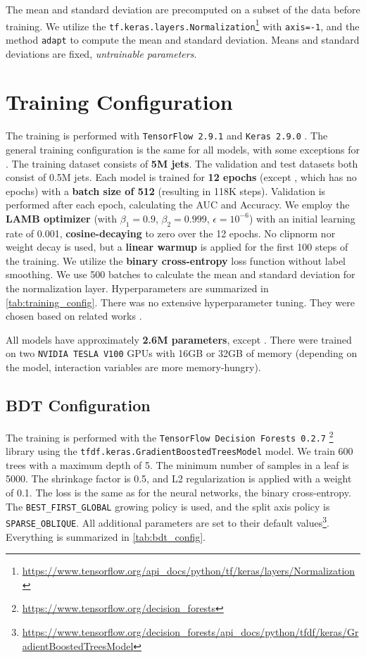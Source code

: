 The mean and standard deviation are precomputed on a subset of the data before training.
We utilize the \texttt{tf.keras.layers.Normalization}\footnote{\url{https://www.tensorflow.org/api_docs/python/tf/keras/layers/Normalization}} with \texttt{axis=-1}, and the method \texttt{adapt} to compute the mean and standard deviation.
Means and standard deviations are fixed, \emph{untrainable parameters}.


\section{Training Configuration}
\label{sec:training_config}

The training is performed with \texttt{TensorFlow 2.9.1} \cite{tf} and \texttt{Keras 2.9.0} \cite{keras}.
The general training configuration is the same for all models, with some exceptions for \bdt.
The training dataset consists of \textbf{5M jets}.
The validation and test datasets both consist of 0.5M jets.
Each model is trained for \textbf{12 epochs} (except \bdt, which has no epochs) with a \textbf{batch size of 512} (resulting in 118K steps).
Validation is performed after each epoch, calculating the AUC and Accuracy.
We employ the \textbf{LAMB optimizer} (with $\beta_1= 0.9$, $\beta_2= 0.999$, $\epsilon= 10^{-6}$) with an initial learning rate of 0.001, \textbf{cosine-decaying} to zero over the 12 epochs.
No clipnorm nor weight decay is used, but a \textbf{linear warmup} is applied for the first 100 steps of the training.
We utilize the \textbf{binary cross-entropy} loss function without label smoothing.
We use 500 batches to calculate the mean and standard deviation for the normalization layer.
Hyperparameters are summarized in \cref{tab:training_config}.
There was no extensive hyperparameter tuning. 
They were chosen based on related works \cite{deit3,part,cait,bert}.

All models have approximately \textbf{2.6M parameters}, except \bdt.
There were trained on two \texttt{NVIDIA TESLA V100} GPUs with 16GB or 32GB of memory (depending on the model, interaction variables are more memory-hungry).

\subsection{BDT Configuration}
\label{sec:bdt_config}

The training is performed with the \texttt{TensorFlow Decision Forests 0.2.7} \footnote{\url{https://www.tensorflow.org/decision_forests}} library using the \texttt{tfdf.keras.GradientBoostedTreesModel} model.
We train 600 trees with a maximum depth of 5.
The minimum number of samples in a leaf is 5000.
The shrinkage factor is 0.5, and L2 regularization is applied with a weight of 0.1.
The loss is the same as for the neural networks, the binary cross-entropy.
The \texttt{BEST\_FIRST\_GLOBAL} growing policy is used, and the split axis policy is \texttt{SPARSE\_OBLIQUE}.
All additional parameters are set to their default values\footnote{\url{https://www.tensorflow.org/decision_forests/api_docs/python/tfdf/keras/GradientBoostedTreesModel}}.
Everything is summarized in \cref{tab:bdt_config}.

